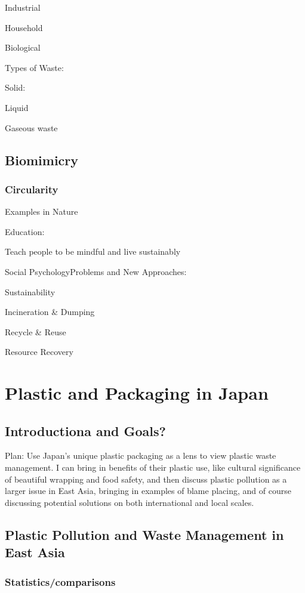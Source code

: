 \documentclass{book}\usepackage{knitr}
\begin{document}
\begin{knitrout}
\begin{kframe}
Industrial

Household

Biological 

Types of Waste:

Solid:

Liquid

Gaseous waste

\section{Biomimicry}

\subsection{Circularity}

Examples in Nature

Education:

Teach people to be mindful and live sustainably

Social PsychologyProblems and New Approaches: 

Sustainability

Incineration \& Dumping

Recycle \& Reuse

Resource Recovery


\chapter{Plastic and Packaging in Japan}

\section{Introductiona and Goals?}

Plan: Use Japan's unique plastic packaging as a lens to view plastic waste management. I can bring in benefits of their plastic use, like cultural significance of beautiful wrapping and food safety, and then discuss plastic pollution as a larger issue in East Asia, bringing in examples of blame placing, and of course discussing potential solutions on both international and local scales. 

\section{Plastic Pollution and Waste Management in East Asia} 

\subsection{Statistics/comparisons}


\end{kframe}
\end{knitrout}
\end{document}
